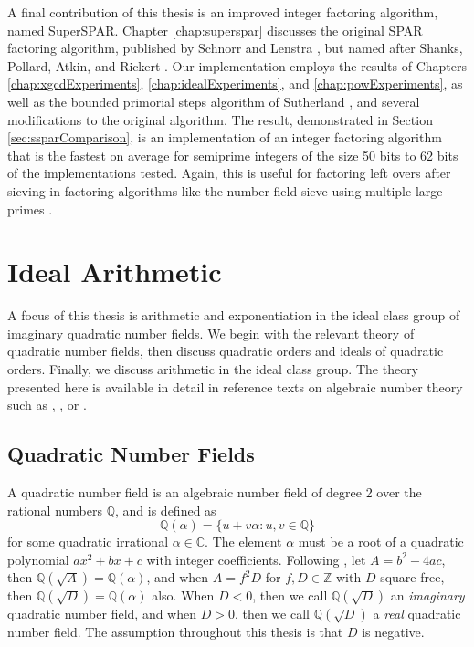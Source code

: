 \documentclass{ucalgthes1}
\theoremstyle{definition}
\newcommand{\CC}{\mathbb{C}}
\newcommand{\ZZ}{\mathbb{Z}}
\newcommand{\QQ}{\mathbb{Q}}
\begin{document}
A final contribution of this thesis is an improved integer factoring algorithm, named \mbox{SuperSPAR}.  Chapter \ref{chap:superspar} discusses the original SPAR factoring algorithm, published by Schnorr and Lenstra \cite{Schnorr1984}, but named after Shanks, Pollard, Atkin, and Rickert \cite[p.484]{Lenstra1992}.  Our implementation employs the results of Chapters \ref{chap:xgcdExperiments}, \ref{chap:idealExperiments}, and \ref{chap:powExperiments}, as well as the bounded primorial steps algorithm of Sutherland \cite{Sutherland2007}, and several modifications to the original algorithm.  The result, demonstrated in Section \ref{sec:ssparComparison}, is an implementation of an integer factoring algorithm that is the fastest on average for semiprime integers of the size 50 bits to 62 bits of the implementations tested.  Again, this is useful for factoring left overs after sieving in factoring algorithms like the number field sieve using multiple large primes \cite[\S 6.1.4]{Crandall2001}.


\chapter{Ideal Arithmetic}
\label{chap:idealArithmetic}

A focus of this thesis is arithmetic and exponentiation in the ideal class group of imaginary quadratic number fields.  We begin with the relevant theory of quadratic number fields, then discuss quadratic orders and ideals of quadratic orders.  Finally, we discuss arithmetic in the ideal class group.  The theory presented here is available in detail in reference texts on algebraic number theory such as \cite{Cohn1980}, \cite{Hua2012}, or \cite{Ireland1990}. 


\section{Quadratic Number Fields}


A quadratic number field is an algebraic number field of degree 2 over the rational numbers $\QQ$, and is defined as
\[
	\QQ(\alpha) = \{u + v\alpha : u,v \in \QQ\}
\]
for some quadratic irrational $\alpha \in \CC$.  The element $\alpha$ must be a root of a quadratic polynomial $ax^2 + bx + c$ with integer coefficients.  Following \cite[p.188]{Ireland1990}, let $A = b^2-4ac$, then $\QQ(\sqrt A) = \QQ(\alpha)$, and when $A = f^2 D$ for $f, D \in \ZZ$ with $D$ square-free, then $\QQ(\sqrt D) = \QQ(\alpha)$ also.  When $D < 0$, then we call $\QQ(\sqrt D)$ an \emph{imaginary} quadratic number field, and when $D > 0$, then we call $\QQ(\sqrt D)$ a \emph{real} quadratic number field.  The assumption throughout this thesis is that $D$ is negative.
\end{document}
